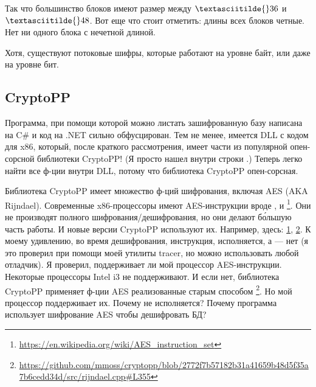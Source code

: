 \begin{figure}[H]
\centering
{}
\end{figure}

Так что большинство блоков имеют размер между $\textasciitilde{}36$ и $\textasciitilde{}48$.
Вот еще что стоит отметить: длины всех блоков четные.
Нет ни одного блока с нечетной длиной.

Хотя, существуют потоковые шифры, которые работают на уровне байт, или даже на уровне бит.

\subsection{CryptoPP}

Программа, при помощи которой можно листать зашифрованную базу написана на C\# и код на .NET сильно обфусцирован.
Тем не менее, имеется DLL с кодом для x86, который, после краткого рассмотрения,
имеет части из популярной опен-сорсной библиотеки CryptoPP!
(Я просто нашел внутри строки .)
Теперь легко найти все ф-ции внутри DLL, потому что библиотека CryptoPP опен-сорсная.

Библиотека CryptoPP имеет множество ф-ций шифрования, включая AES (AKA Rijndael).
Современные x86-процессоры имеют AES-инструкции вроде ,  и 
\footnote{\url{https://en.wikipedia.org/wiki/AES_instruction_set}}.
Они не производят полного шифрования/дешифрования, но они делают б\'{о}льшую часть работы.
И новые версии CryptoPP используют их.
Например, здесь:
\href{https://github.com/mmoss/cryptopp/blob/2772f7b57182b31a41659b48d5f35a7b6cedd34d/src/rijndael.cpp#L1034}{1},
\href{https://github.com/mmoss/cryptopp/blob/2772f7b57182b31a41659b48d5f35a7b6cedd34d/src/rijndael.cpp#L1000}{2}.
К моему удивлению, во время дешифрования, инструкция,  исполняется, а  --- нет
(я это проверил при помощи моей утилиты tracer, но можно использовать любой отладчик).
Я проверил, поддерживает ли мой процессор AES-инструкции. Некоторые процессоры Intel i3 не поддерживают.
И если нет, библиотека CryptoPP применяет ф-ции AES реализованные старым способом
\footnote{\url{https://github.com/mmoss/cryptopp/blob/2772f7b57182b31a41659b48d5f35a7b6cedd34d/src/rijndael.cpp#L355}}.
Но мой процессор поддерживает их.
Почему  не исполняется?
Почему программа использует шифрование AES чтобы дешифровать БД?

